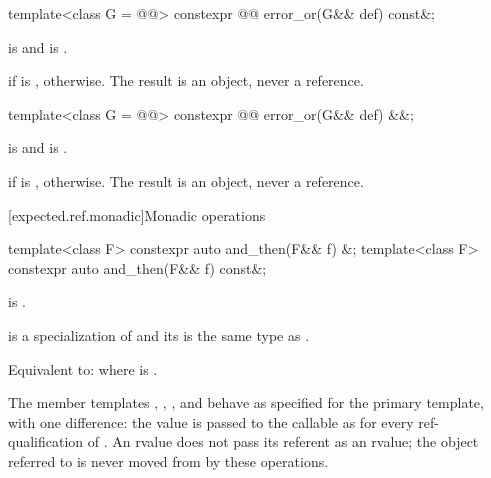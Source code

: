%
\begin{itemdecl}
template<class G = @@>
  constexpr @@ error_or(G&& def) const&;
\end{itemdecl}

\begin{itemdescr}
\pnum
\constraints
{} is  and  is .

\pnum
\returns
{} if  is ,  otherwise. The result is an object, never a reference.
\end{itemdescr}

%
\begin{itemdecl}
template<class G = @@>
  constexpr @@ error_or(G&& def) &&;
\end{itemdecl}

\begin{itemdescr}
\pnum
\constraints
{} is  and  is .

\pnum
\returns
{} if  is ,  otherwise. The result is an object, never a reference.
\end{itemdescr}

[expected.ref.monadic]{Monadic operations}

%
\begin{itemdecl}
template<class F>
  constexpr auto and_then(F&& f) &;
template<class F>
  constexpr auto and_then(F&& f) const&;
\end{itemdecl}

\begin{itemdescr}
\pnum
\constraints
{} is .

\pnum
\mandates
{} is a specialization of  and its  is the same type as .

\pnum
\effects
Equivalent to:  where  is .

\pnum
\remarks
The member templates , , , and  behave as specified for the primary template, with one difference: the value is passed to the callable as  for every ref-qualification of . An rvalue  does not pass its referent as an rvalue; the object referred to is never moved from by these operations.
\end{itemdescr}

